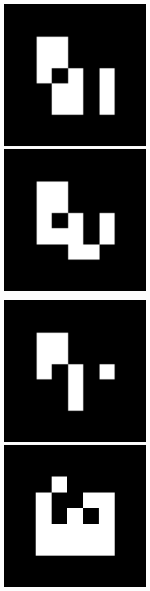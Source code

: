 \documentclass[10pt,letterpaper]{article}
\begin{document}
\includegraphics[width=3in]{MarkerData_157.png}
\includegraphics[width=3in]{MarkerData_158.png}


\includegraphics[width=3in]{MarkerData_159.png}
\includegraphics[width=3in]{MarkerData_160.png}
\end{document}
